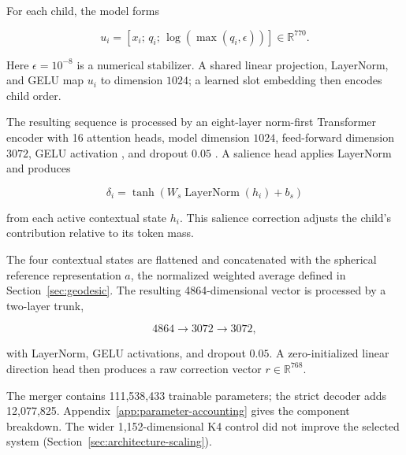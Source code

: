 \documentclass[10pt]{article}
\begin{document}
For each child, the model forms

\[
u_i=[x_i;\,q_i;\,\log(\max(q_i,\epsilon))]\in\mathbb{R}^{770}.
\]

Here \(\epsilon=10^{-8}\) is a numerical stabilizer. A shared linear projection, LayerNorm, and GELU map \(u_i\) to dimension \(1024\); a learned slot embedding then encodes child order.

The resulting sequence is processed by an eight-layer norm-first Transformer encoder \citep{vaswani-etal-2017-attention,xiong-etal-2020-layernorm} with 16 attention heads, model dimension \(1024\), feed-forward dimension \(3072\), GELU activation \citep{hendrycks-gimpel-2016-gelu}, and dropout \(0.05\) \citep{srivastava-etal-2014-dropout}. A salience head applies LayerNorm \citep{ba-etal-2016-layernorm} and produces

\[
\delta_i=\tanh\!\left(W_s\operatorname{LayerNorm}(h_i)+b_s\right)
\]

from each active contextual state \(h_i\). This salience correction adjusts the
child's contribution relative to its token mass.

The four contextual states are flattened and concatenated with the spherical reference representation \(a\), the normalized weighted average defined in Section~\ref{sec:geodesic}. The resulting 4864-dimensional vector is processed by a two-layer trunk,

\[
4864\rightarrow3072\rightarrow3072,
\]

with LayerNorm, GELU activations, and dropout \(0.05\). A zero-initialized linear direction head then produces a raw correction vector \(r\in\mathbb{R}^{768}\).

The merger contains 111,538,433 trainable parameters; the strict decoder adds
12,077,825. Appendix~\ref{app:parameter-accounting} gives the component breakdown.
The wider 1,152-dimensional K4 control did not improve the selected system
(Section~\ref{sec:architecture-scaling}).
\end{document}
